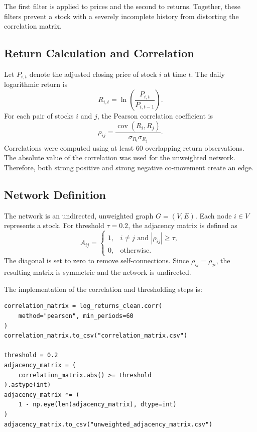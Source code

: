 \documentclass[12pt]{article}
\numberwithin{equation}{section}
\begin{document}
The first filter is applied to prices and the second to returns. Together,
these filters prevent a stock with a severely incomplete history from
distorting the correlation matrix.

\subsection{Return Calculation and Correlation}
Let $P_{i,t}$ denote the adjusted closing price of stock $i$ at time $t$. The
daily logarithmic return is
\begin{equation}
  R_{i,t}=\ln\left(\frac{P_{i,t}}{P_{i,t-1}}\right).
\end{equation}
For each pair of stocks $i$ and $j$, the Pearson correlation coefficient is
\begin{equation}
  \rho_{ij} =
  \frac{\operatorname{cov}(R_i,R_j)}
  {\sigma_{R_i}\sigma_{R_j}}.
\end{equation}
Correlations were computed using at least 60 overlapping return observations.
The absolute value of the correlation was used for the unweighted network.
Therefore, both strong positive and strong negative co-movement create an
edge.

\subsection{Network Definition}
The network is an undirected, unweighted graph $G=(V,E)$. Each node
$i\in V$ represents a stock. For threshold $\tau=0.2$, the adjacency matrix
is defined as
\begin{equation}
  A_{ij} =
  \begin{cases}
    1, & i\ne j \text{ and } |\rho_{ij}|\geq\tau,\\
    0, & \text{otherwise}.
  \end{cases}
\end{equation}
The diagonal is set to zero to remove self-connections. Since
$\rho_{ij}=\rho_{ji}$, the resulting matrix is symmetric and the network is
undirected.

The implementation of the correlation and thresholding steps is:

\begin{lstlisting}[caption={Constructing the correlation and adjacency matrices.}]
correlation_matrix = log_returns_clean.corr(
    method="pearson", min_periods=60
)
correlation_matrix.to_csv("correlation_matrix.csv")

threshold = 0.2
adjacency_matrix = (
    correlation_matrix.abs() >= threshold
).astype(int)
adjacency_matrix *= (
    1 - np.eye(len(adjacency_matrix), dtype=int)
)
adjacency_matrix.to_csv("unweighted_adjacency_matrix.csv")
\end{lstlisting}
\end{document}
